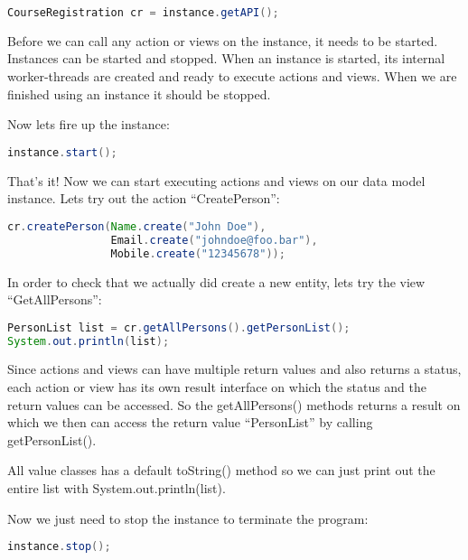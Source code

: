 \begin{lstlisting}[basicstyle={\scriptsize},language=Java,tabsize=2]
CourseRegistration cr = instance.getAPI();
\end{lstlisting}


Before we can call any action or views on the instance, it needs to
be started. Instances can be started and stopped. When an instance
is started, its internal worker-threads are created and ready to execute
actions and views. When we are finished using an instance it should
be stopped.

Now lets fire up the instance:

\begin{lstlisting}[basicstyle={\scriptsize},language=Java,tabsize=2]
instance.start();
\end{lstlisting}


That's it! Now we can start executing actions and views on our data
model instance. Lets try out the action ``CreatePerson'':

\begin{lstlisting}[basicstyle={\scriptsize},language=Java,tabsize=2]
cr.createPerson(Name.create("John Doe"),
				Email.create("johndoe@foo.bar"),
				Mobile.create("12345678"));
\end{lstlisting}


In order to check that we actually did create a new entity, lets try
the view ``GetAllPersons'':

\begin{lstlisting}[basicstyle={\scriptsize},language=Java,tabsize=2]
PersonList list = cr.getAllPersons().getPersonList();
System.out.println(list);
\end{lstlisting}


Since actions and views can have multiple return values and also returns
a status, each action or view has its own result interface on which
the status and the return values can be accessed. So the getAllPersons()
methods returns a result on which we then can access the return value
``PersonList'' by calling getPersonList().

All value classes has a default toString() method so we can just print
out the entire list with System.out.println(list).

Now we just need to stop the instance to terminate the program:

\begin{lstlisting}[basicstyle={\scriptsize},language=Java,tabsize=2]
instance.stop();
\end{lstlisting}


